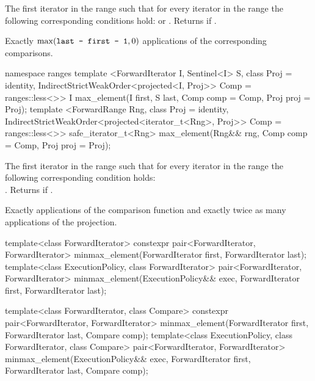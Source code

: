 \begin{itemdescr}
\pnum
\returns
The first iterator
in the range
such that for every iterator
in the range
the following corresponding conditions hold:
or
.
Returns
if
.

\pnum
\complexity
Exactly
$\max(\texttt{last - first - 1}, 0)$
applications of the corresponding comparisons.
\end{itemdescr}

\begin{addedblock}
%
\begin{itemdecl}
namespace ranges {
  template <ForwardIterator I, Sentinel<I> S, class Proj = identity,
            IndirectStrictWeakOrder<projected<I, Proj>> Comp = ranges::less<>>
    I max_element(I first, S last, Comp comp = Comp{}, Proj proj = Proj{});
  template <ForwardRange Rng, class Proj = identity,
            IndirectStrictWeakOrder<projected<iterator_t<Rng>, Proj>> Comp = ranges::less<>>
    safe_iterator_t<Rng> max_element(Rng&& rng, Comp comp = Comp{}, Proj proj = Proj{});
}
\end{itemdecl}

\begin{itemdescr}
\pnum
\returns
The first iterator
in the range
such that for every iterator
in the range
the following corresponding condition holds: \\
.
Returns
if
.

\pnum
\complexity
Exactly
applications of the comparison function and
exactly twice as many applications of the projection.
\end{itemdescr}
\end{addedblock}

%
\begin{itemdecl}
template<class ForwardIterator>
  constexpr pair<ForwardIterator, ForwardIterator>
    minmax_element(ForwardIterator first, ForwardIterator last);
template<class ExecutionPolicy, class ForwardIterator>
  pair<ForwardIterator, ForwardIterator>
    minmax_element(ExecutionPolicy&& exec,
                   ForwardIterator first, ForwardIterator last);

template<class ForwardIterator, class Compare>
  constexpr pair<ForwardIterator, ForwardIterator>
    minmax_element(ForwardIterator first, ForwardIterator last, Compare comp);
template<class ExecutionPolicy, class ForwardIterator, class Compare>
  pair<ForwardIterator, ForwardIterator>
    minmax_element(ExecutionPolicy&& exec,
                   ForwardIterator first, ForwardIterator last, Compare comp);
\end{itemdecl}

